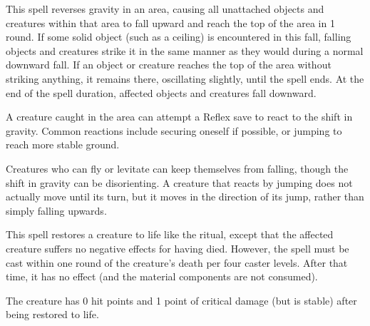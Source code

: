 \spellrng{\rngclose}
\begin{spelleffect}
  This spell reverses gravity in an area, causing all unattached objects and creatures within that area to fall upward and reach the top of the area in 1 round. If some solid object (such as a ceiling) is encountered in this fall, falling objects and creatures strike it in the same manner as they would during a normal downward fall. If an object or creature reaches the top of the area without striking anything, it remains there, oscillating slightly, until the spell ends. At the end of the spell duration, affected objects and creatures fall downward.
  \par A creature caught in the area can attempt a Reflex save to react to the shift in gravity. Common reactions include securing oneself if possible, or jumping to reach more stable ground.
\end{spelleffect}
\begin{spellnotes}
  Creatures who can fly or levitate can keep themselves from falling, though the shift in gravity can be disorienting. A creature that reacts by jumping does not actually move until its turn, but it moves in the direction of its jump, rather than simply falling upwards.
\end{spellnotes}

\begin{spelleffect}
  This spell restores a creature to life like the  ritual, except that the affected creature suffers no negative effects for having died. However, the spell must be cast within one round of the creature's death per four caster levels. After that time, it has no effect (and the material components are not consumed).

  The creature has 0 hit points and 1 point of critical damage (but is stable) after being restored to life.
\end{spelleffect}


